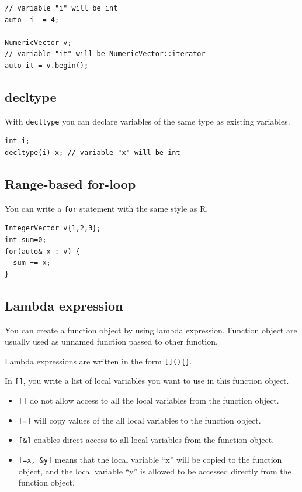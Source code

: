 \documentclass[]{book}
\providecommand{\tightlist}{%
  \setlength{\itemsep}{0pt}\setlength{\parskip}{0pt}}
\theoremstyle{definition}
\theoremstyle{definition}
\theoremstyle{remark}
\begin{document}
\begin{verbatim}
// variable "i" will be int
auto  i  = 4;

NumericVector v;
// variable "it" will be NumericVector::iterator
auto it = v.begin();
\end{verbatim}

\subsection{decltype}\label{decltype}

With \texttt{decltype} you can declare variables of the same type as
existing variables.

\begin{verbatim}
int i;
decltype(i) x; // variable "x" will be int
\end{verbatim}

\subsection{Range-based for-loop}\label{range-based-for-loop}

You can write a \texttt{for} statement with the same style as R.

\begin{verbatim}
IntegerVector v{1,2,3};
int sum=0;
for(auto& x : v) {
  sum += x;
}
\end{verbatim}

\subsection{Lambda expression}\label{lambda-expression}

You can create a function object by using lambda expression. Function
object are usually used as unnamed function passed to other function.

Lambda expressions are written in the form \texttt{{[}{]}()\{\}}.

In \texttt{{[}{]}}, you write a list of local variables you want to use
in this function object.

\begin{itemize}
\tightlist
\item
  \texttt{{[}{]}} do not allow access to all the local variables from
  the function object.
\item
  \texttt{{[}={]}} will copy values of the all local variables to the
  function object.
\item
  \texttt{{[}\&{]}} enables direct access to all local variables from
  the function object.
\item
  \texttt{{[}=x,\ \&y{]}} means that the local variable ``x'' will be
  copied to the function object, and the local variable ``y'' is allowed
  to be accessed directly from the function object.
\end{itemize}
\end{document}
